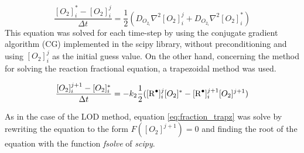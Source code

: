 \begin{refsection}
\begin{equation}
    \frac{[O_2]_i^*-[O_2]_i^j}{\Delta t} = \frac{1}{2}(D_{O_{2_i}}\nabla^2[O_2]_i^j + D_{O_{2_i}}\nabla^2[O_2]_i^*)
    \label{eq:fraction_CN}
\end{equation}
This equation was solved for each time-step by using the conjugate gradient algorithm (CG) implemented in the scipy library, without preconditioning and using $[O_2]_i^j$ as the initial guess value. On the other hand, concerning the method for solving the reaction fractional equation, a trapezoidal method was used.

\begin{equation}
    \frac{[O_2]_i^{j+1}-[O_2]_i^*}{\Delta t}= -k_2 \frac{1}{2}([\ce{R^.}]_i^j[O_2]^*-[\ce{R^.}]_i^{j+1}[O_2]^{j+1}) \label{eq:fraction_trapz}
\end{equation}

As in the case of the LOD method, equation \ref{eq:fraction_trapz} was solve by rewriting the equation to the form $F([O_2]^{j+1})=0$ and finding the root of the equation with the function \textit{fsolve} of \textit{scipy}. 


\end{refsection}
